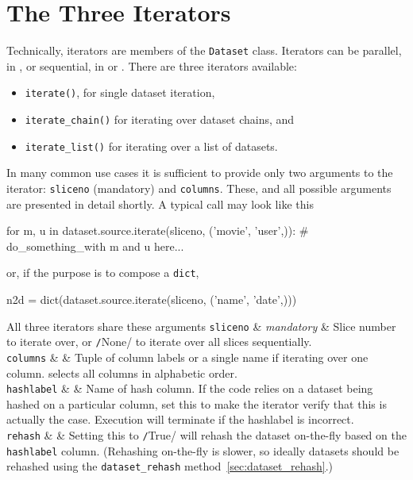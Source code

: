 \section{The Three Iterators}
Technically, iterators are members of the \texttt{Dataset} class.
Iterators can be parallel, in \analysis, or sequential, in \prepare
or \synthesis.  There are three iterators available:
\begin{itemize}
\item [] \texttt{iterate()}, for single dataset iteration,
\item [] \texttt{iterate\_chain()} for iterating over dataset chains, and
\item [] \texttt{iterate\_list()} for iterating over a list of datasets.
\end{itemize}
In many common use cases it is sufficient to provide only two arguments
to the iterator: \texttt{sliceno} (mandatory) and \texttt{columns}.
These, and all possible arguments are presented in detail shortly. A
typical call may look like this
\begin{python}
for m, u in dataset.source.iterate(sliceno, ('movie', 'user',)):
    # do_something_with m and u here...
\end{python}
or, if the purpose is to compose a \texttt{dict},
\begin{python}
n2d = dict(dataset.source.iterate(sliceno, ('name', 'date',)))
\end{python}

All three iterators share these arguments
\starttable
  \RP \texttt{sliceno} & \textsl{mandatory} & Slice number to iterate
  over, or \texttt/None/ to iterate over all slices
  sequentially. \\[1ex]

  \RP \texttt{columns} & \pyNone & Tuple of column labels or a single name if
  iterating over one column.  \pyNone selects all columns in alphabetic order.\\[1ex]

  \RP \texttt{hashlabel} & \pyNone & Name of hash column.  If the code relies
  on a dataset being hashed on a particular column, set this to make
  the iterator verify that this is actually the case.  Execution will terminate
  if the hashlabel is incorrect.\\[1ex]

  \RP \texttt{rehash} & \pyFalse & Setting this
  to \texttt/True/ will rehash the dataset on-the-fly
  based on the \texttt{hashlabel} column.  (Rehashing on-the-fly is
  slower, so ideally datasets should be rehashed using
  the \texttt{dataset\_rehash} method~\ref{sec:dataset_rehash}.)\\[1ex]
  
